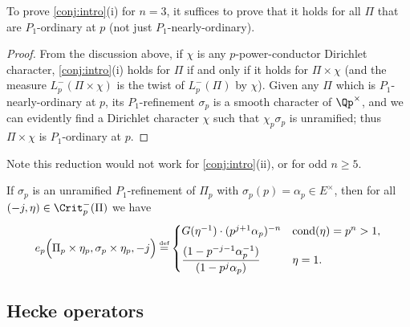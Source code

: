 \documentclass[10pt,reqno,a4paper]{amsart}
\begin{document}
  \begin{proposition}\label{prop:nearly-ordinary vs ordinary}
   To prove \cref{conj:intro}(i) for $n = 3$, it suffices to prove that it holds for all $\Pi$ that are $P_1$-ordinary at $p$ (not just $P_1$-nearly-ordinary).
  \end{proposition}
    
  \begin{proof}
   From the discussion above, if $\chi$ is any $p$-power-conductor Dirichlet character, \cref{conj:intro}(i) holds for $\Pi$ if and only if it holds for $\Pi \times \chi$ (and the measure $L_p^-(\Pi \times \chi)$ is the twist of $L_p^-(\Pi)$ by $\chi$). Given any $\Pi$ which is $P_1$-nearly-ordinary at $p$, its $P_1$-refinement $\sigma_p$ is a smooth character of $\Qp^\times$, and we can evidently find a Dirichlet character $\chi$ such that $\chi_p \sigma_p$ is unramified; thus $\Pi \times \chi$ is $P_1$-ordinary at $p$.
  \end{proof}
  
  \begin{remark}
   Note this reduction would not work for \cref{conj:intro}(ii), or for odd $n \ge 5$.
  \end{remark}
  
  \begin{example}\label{ex:unramified P1 refinement}
   If $\sigma_p$ is an unramified $P_1$-refinement of $\Pi_p$ with $\sigma_p(p)= \alpha_p \in E^\times$, then for all $(-j, \eta) \in \Crit_p^-(\Pi)$ we have
   \[ e_p\Big(\Pi_p \times \eta_p, \sigma_p \times \eta_p, -j\Big) \defeq \begin{cases}
   	G(\eta^{-1}) \cdot (p^{j+1}\alpha_p)^{-n} & \operatorname{cond}(\eta) = p^n > 1,\\[2mm]
   	\displaystyle\frac{(1-p^{-j-1}\alpha_p^{-1})}{(1 - p^j \alpha_p)} & \eta = 1.
   \end{cases}
   \]
  \end{example}
  


\subsection{Hecke operators}
\label{sec:U_p}
\end{document}
